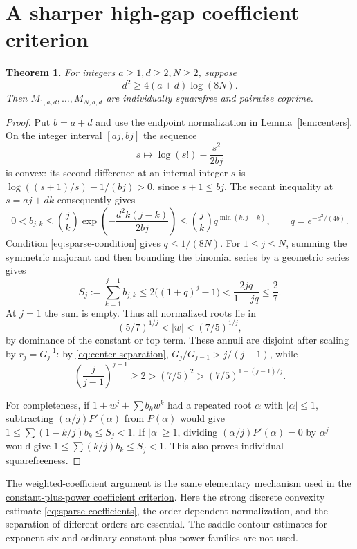 \documentclass[11pt]{article}
\newtheorem{theorem}{Theorem}
\begin{document}
\section{A sharper high-gap coefficient criterion}
\begin{theorem}\label{thm:sparse}
For integers $a\ge1,d\ge2,N\ge2$, suppose
\[
 d^2\ge4(a+d)\log(8N).                                    \tag{6}\label{eq:sparse-condition}
\]
Then $M_{1,a,d},\ldots,M_{N,a,d}$ are individually squarefree
and pairwise coprime.
\end{theorem}
\begin{proof}
Put $b=a+d$ and use the endpoint normalization in
Lemma~\ref{lem:centers}. On the integer interval $[aj,bj]$ the
sequence
\[
 s\longmapsto \log(s!)-\frac{s^2}{2bj}
\]
is convex: its second difference at an internal integer $s$ is
$\log((s+1)/s)-1/(bj)>0$, since $s+1\le bj$.
The secant inequality at $s=aj+dk$ consequently gives
\[
 0<b_{j,k}\le\binom jk
  \exp\left(-\frac{d^2k(j-k)}{2bj}\right)
 \le\binom jk q^{\min(k,j-k)},\qquad
 q=e^{-d^2/(4b)}.                                         \tag{7}\label{eq:sparse-coefficients}
\]
Condition \eqref{eq:sparse-condition} gives $q\le1/(8N)$.
For $1\le j\le N$, summing the symmetric majorant and then bounding
the binomial series by a geometric series gives
\[
 S_j:=\sum_{k=1}^{j-1}b_{j,k}
 \le2\bigl((1+q)^j-1\bigr)
 <\frac{2jq}{1-jq}\le\frac27.
\]
At $j=1$ the sum is empty. Thus all normalized roots lie in
\[
 (5/7)^{1/j}<|w|<(7/5)^{1/j},                              \tag{8}\label{eq:sparse-annuli}
\]
by dominance of the constant or top term.
These annuli are disjoint after scaling by $r_j=G_j^{-1}$:
by \eqref{eq:center-separation}, $G_j/G_{j-1}>j/(j-1)$, while
\[
 \left(\frac j{j-1}\right)^{j-1}\ge2>
 (7/5)^2>(7/5)^{1+(j-1)/j}.
\]

For completeness, if $1+w^j+\sum b_kw^k$ had a repeated root
$\alpha$ with $|\alpha|\le1$, subtracting $(\alpha/j)P'(\alpha)$
from $P(\alpha)$ would give
$1\le\sum(1-k/j)b_k\le S_j<1$.
If $|\alpha|\ge1$, dividing $(\alpha/j)P'(\alpha)=0$ by
$\alpha^j$ would give $1\le\sum(k/j)b_k\le S_j<1$.
This also proves individual squarefreeness.
\end{proof}
The weighted-coefficient argument is the same elementary mechanism
used in the
\href{ALL_EXPONENTS_AND_LARGE_EXPONENT_CUTOFF.tex}{constant-plus-power coefficient criterion}.
Here the strong discrete convexity estimate \eqref{eq:sparse-coefficients}, the order-dependent
normalization, and the separation of different orders are essential.
The saddle-contour estimates for exponent six and ordinary
constant-plus-power families are not used.
\end{document}
